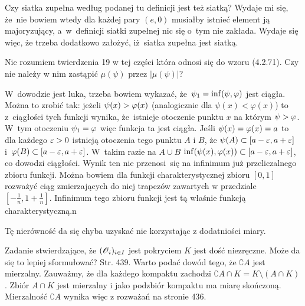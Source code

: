 \documentclass[a4paper,11pt]{article}
\begin{document}
\vspace{\spaceFour}


\start {} Czy siatka zupełna według podanej tu definicji jest
też siatką? Wydaje mi się, że~nie bowiem wtedy dla każdej pary
$(e, 0)$ musiałby istnieć element ją majoryzujący, a~w~definicji
siatki zupełnej nic się o~tym nie zakłada. Wydaje się więc, że trzeba
dodatkowo założyć, iż~siatka zupełna jest siatką.

\vspace{\spaceFour}


\start {} Nie rozumiem twierdzenia 19 w tej części która odnosi
się do wzoru (4.2.71). Czy nie należy w nim zastąpić $\mu( \psi )$
przez $| \mu( \psi ) |$?

\vspace{\spaceFour}


\start {} W~dowodzie jest luka, trzeba bowiem wykazać,
że~$\psi_{ 1 } = \inf( \psi, \varphi )$ jest ciągła. Można to zrobić tak:
jeżeli $\psi( x ) > \varphi( x )$ (analogicznie dla
$\psi( x ) < \varphi( x )$) to z~ciągłości tych funkcji wynika,
że~istnieje otoczenie punktu $x$ na którym $\psi > \varphi$. W~tym
otoczeniu $\psi_{ 1 } = \varphi$ więc funkcja ta jest ciągła. Jeśli
$\psi( x ) = \varphi( x ) = a$ to dla każdego $\varepsilon > 0$ istnieją
otoczenia tego punktu $A$ i $B$, że
$\psi( A ) \subset [ a - \varepsilon, a + \varepsilon ]$
i~$\varphi( B ) \subset [ a - \varepsilon, a + \varepsilon ]$. W~takim razie na
$A \cup B$
$\inf( \psi( x ), \varphi( x ) ) \subset [ a - \varepsilon, a + \varepsilon ]$, co
dowodzi ciągłości. Wynik ten nie przenosi~się na infinimum już
przeliczalnego zbioru funkcji. Można bowiem dla funkcji
charakterystycznej zbioru $[0, 1]$ rozważyć ciąg zmierzających do niej
trapezów zawartych w przedziale
$[-\frac{ 1 }{ n }, 1 + \frac{ 1 }{ n } ]$. Infinimum tego zbioru
funkcji jest tą właśnie funkcją charakterystyczną.n

\vspace{\spaceFour}


\start {} Tę nierówność da się chyba uzyskać nie korzystając z
dodatniości miary.

\vspace{\spaceFour}


\start {} Zadanie stwierdzające, że
$( \mathcal{O}_{ i } )_{ i \in I }$ jest pokryciem $K$ jest dość
niezręczne. Może da się to lepiej sformułować? \start Str. 439. Warto
podać dowód tego, że $\complement A$ jest mierzalny. Zauważmy, że dla
każdego kompaktu zachodzi
$\complement A \cap K = K \setminus ( A \cap K )$. Zbiór $A \cap K$
jest mierzalny i jako podzbiór kompaktu ma miarę skończoną.
Mierzalność $\complement A$ wynika więc z rozważań na stronie 436.
\end{document}
